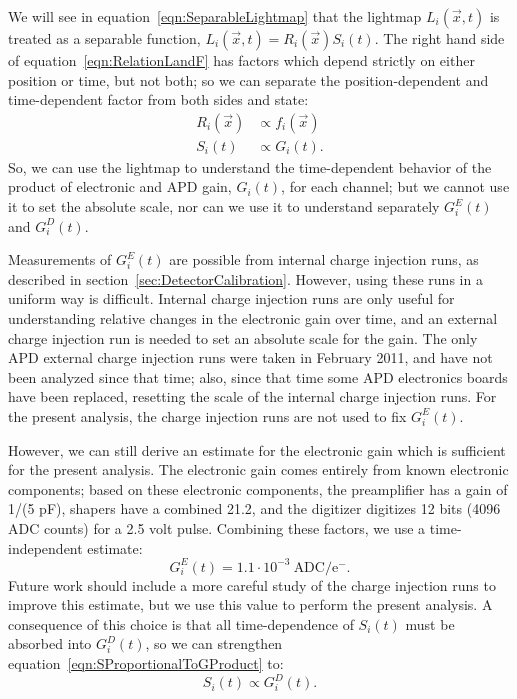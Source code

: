 We will see in equation~\ref{eqn:SeparableLightmap} that the lightmap $L_i(\vec{x},t)$ is treated as a separable function, $L_i(\vec{x},t) = R_i(\vec{x})S_i(t)$.  The right hand side of equation~\ref{eqn:RelationLandF} has factors which depend strictly on either position or time, but not both; so we can separate the position-dependent and time-dependent factor from both sides and state:
\begin{subequations}\begin{align}
R_i(\vec{x}) &\propto f_i(\vec{x}) \\
S_i(t) &\propto G_i(t).\label{eqn:SProportionalToGProduct}
\end{align}\end{subequations}
So, we can use the lightmap to understand the time-dependent behavior of the product of electronic and APD gain, $G_i(t)$, for each channel; but we cannot use it to set the absolute scale, nor can we use it to understand separately $G_i^E(t)$ and $G_i^D(t)$.

Measurements of $G^E_i(t)$ are possible from internal charge injection runs, as described in section~\ref{sec:DetectorCalibration}.  However, using these runs in a uniform way is difficult.  Internal charge injection runs are only useful for understanding relative changes in the electronic gain over time, and an external charge injection run is needed to set an absolute scale for the gain.  The only APD external charge injection runs were taken in February 2011, and have not been analyzed since that time; also, since that time some APD electronics boards have been replaced, resetting the scale of the internal charge injection runs.  For the present analysis, the charge injection runs are not used to fix $G^E_i(t)$.

However, we can still derive an estimate for the electronic gain which is sufficient for the present analysis.  The electronic gain comes entirely from known electronic components; based on these electronic components, the preamplifier has a gain of 1/(5 pF), shapers have a combined 21.2, and the digitizer digitizes 12 bits (4096 ADC counts) for a 2.5 volt pulse.  Combining these factors, we use a time-independent estimate:
\begin{equation}\label{eqn:ApproxForGE}
G^E_i(t) = 1.1 \cdot 10^{-3}\:\text{ADC}/\text{e}^-.
\end{equation}
Future work should include a more careful study of the charge injection runs to improve this estimate, but we use this value to perform the present analysis.  A consequence of this choice is that all time-dependence of $S_i(t)$ must be absorbed into $G^D_i(t)$, so we can strengthen equation~\ref{eqn:SProportionalToGProduct} to:
\begin{equation}\label{eqn:S_propto_GD}
S_i(t) \propto G_i^D(t).
\end{equation}

